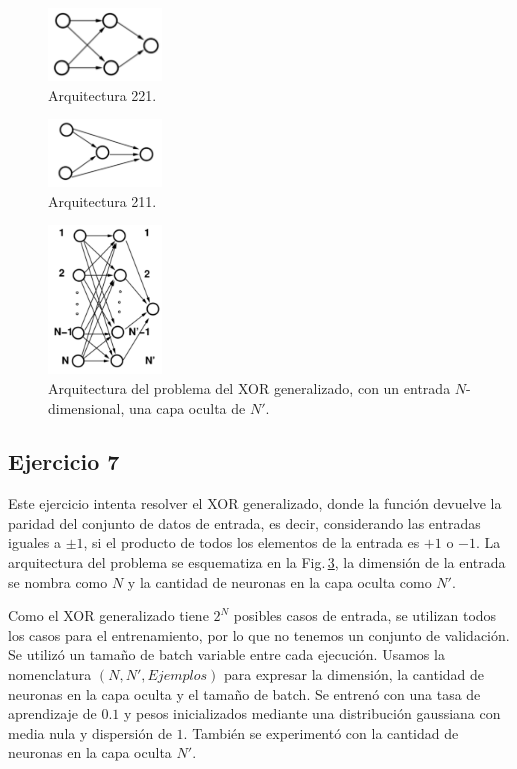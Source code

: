 \begin{figure}[H]
    \centering
    \includegraphics[width=0.27\textwidth]{Graphs/221.png}
    \caption{Arquitectura 221.}
    \label{fig:221}
\end{figure}
\begin{figure}[H]
    \centering
    \includegraphics[width=0.27\textwidth]{Graphs/211.png}
    \caption{Arquitectura 211.}
    \label{fig:211}
\end{figure}


\begin{figure}[H]
    \centering
    \includegraphics[width=0.27\textwidth]{Graphs/NN1.png}
    \caption{Arquitectura del problema del XOR generalizado, con un entrada $N$-dimensional, una capa oculta de $N'$.}
    \label{fig:NN1}
\end{figure}



\subsection*{Ejercicio 7}
Este ejercicio intenta resolver el XOR  generalizado, donde la función devuelve la paridad del conjunto de datos de entrada, es decir, considerando las entradas iguales a $\pm1$, si  el producto de todos los elementos de la entrada es $+1$ o $-1$.  La arquitectura del problema se esquematiza en  la Fig.\,\ref{fig:NN1}, la dimensión de la entrada se nombra como $N$ y la cantidad de neuronas en la capa oculta como $N'$.


Como el XOR generalizado tiene $2^N$ posibles casos de entrada, se utilizan todos los casos para el entrenamiento, por lo que no tenemos un conjunto de validación.  Se utilizó un tamaño de batch variable entre cada ejecución. Usamos la nomenclatura $(N,N',Ejemplos)$ para expresar la dimensión, la cantidad de neuronas en la capa oculta y el tamaño de batch. Se entrenó con una tasa de aprendizaje de $0.1$ y pesos inicializados mediante una distribución gaussiana con media nula y dispersión de $1$. También se experimentó con la cantidad de neuronas en la capa oculta $N'$.


